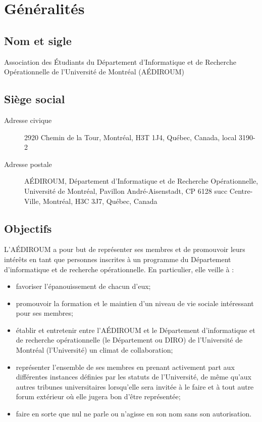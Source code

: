 \documentclass[12pt]{article}
\begin{document}
\section{Généralités}

\subsection{Nom et sigle}
Association des Étudiants du Département d'Informatique et de Recherche Opérationnelle de l'Université de Montréal (AÉDIROUM)

\subsection{Siège social}
  \begin{description}
  \item[Adresse civique] 2920 Chemin de la Tour, Montréal, H3T 1J4, Québec, Canada, local 3190-2
  \item[Adresse postale] AÉDIROUM, Département d'Informatique et de Recherche Opérationnelle, Université de Montréal, Pavillon André-Aisenstadt, CP 6128 succ Centre-Ville, Montréal, H3C 3J7, Québec, Canada
  \end{description}

\subsection{Objectifs}

L'AÉDIROUM a pour but de représenter ses membres et de promouvoir leurs intérêts en tant que personnes inscrites à un programme du Département d'informatique et de recherche opérationnelle. En particulier, elle veille à :
\begin{itemize}
\item favoriser l'épanouissement de chacun d'eux;
\item promouvoir la formation et le maintien d'un niveau de vie sociale intéressant pour ses membres;
\item établir et entretenir entre l'AÉDIROUM et le Département d'informatique et de recherche opérationnelle (le Département ou DIRO) de l'Université de Montréal (l'Université) un climat de collaboration;
\item représenter l'ensemble de ses membres en prenant activement part aux différentes instances définies par les statuts de l'Université, de même qu'aux autres tribunes universitaires lorsqu'elle sera invitée à le faire et à tout autre forum extérieur où elle jugera bon d'être représentée;
\item faire en sorte que nul ne parle ou n'agisse en son nom sans son autorisation.
\end{itemize}
\end{document}

